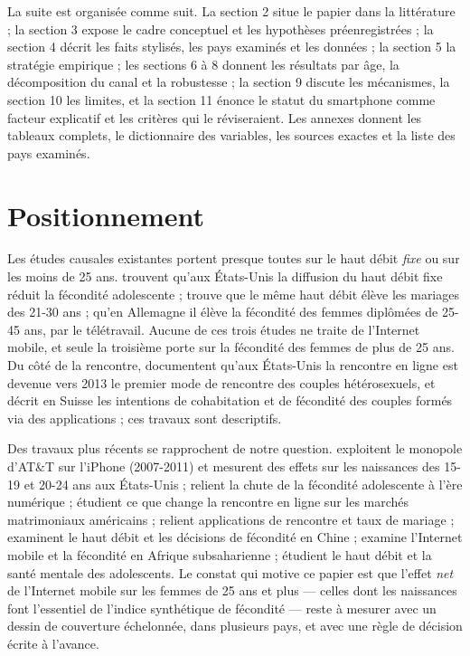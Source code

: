 \documentclass[11pt,a4paper]{article}
\begin{document}
La suite est organisée comme suit. La section 2 situe le papier dans la littérature ; la section 3 expose le cadre conceptuel et les hypothèses préenregistrées ; la section 4 décrit les faits stylisés, les pays examinés et les données ; la section 5 la stratégie empirique ; les sections 6 à 8 donnent les résultats par âge, la décomposition du canal et la robustesse ; la section 9 discute les mécanismes, la section 10 les limites, et la section 11 énonce le statut du smartphone comme facteur explicatif et les critères qui le réviseraient. Les annexes donnent les tableaux complets, le dictionnaire des variables, les sources exactes et la liste des pays examinés.

\section{Positionnement}

Les études causales existantes portent presque toutes sur le haut débit \emph{fixe} ou sur les moins de 25 ans. \citet{guldi2017} trouvent qu'aux États-Unis la diffusion du haut débit fixe réduit la fécondité adolescente ; \citet{bellou2015} trouve que le même haut débit élève les mariages des 21-30 ans ; \citet{billari2019} qu'en Allemagne il élève la fécondité des femmes diplômées de 25-45 ans, par le télétravail. Aucune de ces trois études ne traite de l'Internet mobile, et seule la troisième porte sur la fécondité des femmes de plus de 25 ans. Du côté de la rencontre, \citet{rosenfeld2019} documentent qu'aux États-Unis la rencontre en ligne est devenue vers 2013 le premier mode de rencontre des couples hétérosexuels, et \citet{potarca2020} décrit en Suisse les intentions de cohabitation et de fécondité des couples formés via des applications ; ces travaux sont descriptifs.

Des travaux plus récents se rapprochent de notre question. \citet{myers2026} exploitent le monopole d'AT\&T sur l'iPhone (2007-2011) et mesurent des effets sur les naissances des 15-19 et 20-24 ans aux États-Unis ; \citet{hudson2026} relient la chute de la fécondité adolescente à l'ère numérique ; \citet{ershov2026} étudient ce que change la rencontre en ligne sur les marchés matrimoniaux américains ; \citet{jung2026} relient applications de rencontre et taux de mariage ; \citet{si2025} examinent le haut débit et les décisions de fécondité en Chine ; \citet{liu2026} examine l'Internet mobile et la fécondité en Afrique subsaharienne ; \citet{churchill2026} étudient le haut débit et la santé mentale des adolescents. Le constat qui motive ce papier est que l'effet \emph{net} de l'Internet mobile sur les femmes de 25 ans et plus — celles dont les naissances font l'essentiel de l'indice synthétique de fécondité — reste à mesurer avec un dessin de couverture échelonnée, dans plusieurs pays, et avec une règle de décision écrite à l'avance.
\end{document}
